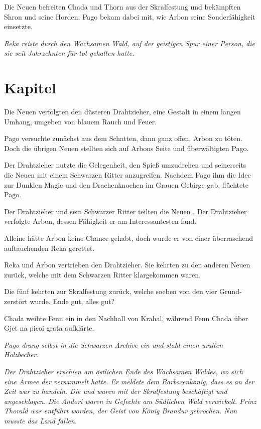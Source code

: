 Die Neuen  befreiten Chada und Thorn aus der Skralfestung und bekämpften Shron und seine Horden. Pago bekam dabei mit, wie Arbon seine Sonderfähigkeit einsetzte.

\trennzeichen

\textit{Reka reiste durch den Wachsamen Wald, auf der geistigen Spur einer Person, die sie seit Jahrzehnten für tot gehalten hatte.}


\newpage
\section{Kapitel}


Die Neuen  verfolgten den düsteren Drahtzieher, eine Gestalt in einem langen Umhang, umgeben von blauem Rauch und Feuer.

Pago versuchte zunächst aus dem Schatten, dann ganz offen, Arbon zu töten. Doch die übrigen Neuen  stellten sich auf Arbons Seite und überwältigten Pago.

Der Drahtzieher nutzte die Gelegenheit, den Spieß umzudrehen und seinerseits die Neuen  mit einem Schwarzen Ritter anzugreifen. Nachdem Pago ihm die Idee zur Dunklen Magie und den Drachenknochen im Grauen Gebirge gab, flüchtete Pago.

Der Drahtzieher und sein Schwarzer Ritter teilten die Neuen . Der Drahtzieher verfolgte Arbon, dessen Fähigkeit er am Interessantesten fand.

Alleine hätte Arbon keine Chance gehabt, doch wurde er von einer überraschend auftauchenden Reka gerettet.

Reka und Arbon vertrieben den Drahtzieher. Sie kehrten zu den anderen Neuen  zurück, welche mit dem Schwarzen Ritter klargekommen waren. 

Die fünf kehrten zur Skralfestung zurück, welche soeben von den vier Grund- zerstört wurde. Ende gut, alles gut?

Chada weihte Fenn ein in den Nachhall von Krahal, während Fenn Chada über Gjet na picoi grata aufklärte.

\trennzeichen

\textit{Pago drang selbst in die Schwarzen Archive ein und stahl einen uralten Holzbecher.}

\trennzeichen

\textit{Der Drahtzieher erschien am östlichen Ende des Wachsamen Waldes, wo sich eine Armee der  versammelt hatte. Er meldete dem Barbarenkönig, dass es an der Zeit war zu handeln. Die  und  waren mit der Skralfestung beschäftigt und angeschlagen. Die Andori waren in Gefechte am Südlichen Wald verwickelt. Prinz Thorald war entführt worden, der Geist von König Brandur gebrochen. Nun musste das Land fallen.}

